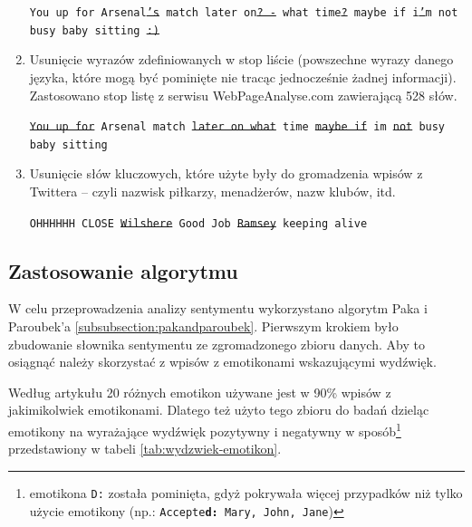 \begin{enumerate}
  \texttt{You up for Arsenal\sout{'s} match later on\sout{? -} what
  time\sout{?} maybe if i\sout{'}m not busy baby sitting \sout{:)}} 
	
	\item Usunięcie wyrazów zdefiniowanych w stop liście (powszechne wyrazy danego
	języka, które mogą być pominięte nie tracąc jednocześnie żadnej informacji).
	Zastosowano stop listę z serwisu \mbox{WebPageAnalyse.com} 
	\cite{WebPageAnalyse} zawierającą 528 słów.

	\texttt{\sout{You up for} Arsenal match \sout{later on what} time \sout{maybe if} 
 	im \sout{not} busy baby sitting}
	
	\item Usunięcie słów kluczowych, które użyte były do gromadzenia wpisów z
	Twittera -- czyli nazwisk piłkarzy, menadżerów, nazw klubów, itd.
	
	
	\texttt{OHHHHHH CLOSE \sout{Wilshere} Good Job \sout{Ramsey} keeping alive}
	
\end{enumerate}





\subsection{Zastosowanie algorytmu}
\label{subsection:sentyment-algorytm}

W celu przeprowadzenia analizy sentymentu wykorzystano algorytm Paka i
Paroubek'a \ref{subsubsection:pakandparoubek}. Pierwszym krokiem było zbudowanie
słownika sentymentu ze zgromadzonego zbioru danych. Aby to osiągnąć należy
skorzystać z wpisów z emotikonami wskazującymi wydźwięk. 

Według artykułu \cite{EmoticonAnalysisTwitter} 20 różnych emotikon używane
jest w 90\% wpisów z jakimikolwiek emotikonami.
Dlatego też użyto tego zbioru do badań dzieląc emotikony na
wyrażające wydźwięk pozytywny i negatywny w sposób\footnote{emotikona \texttt{D:} została pominięta, gdyż
pokrywała więcej przypadków niż tylko użycie emotikony (np.:
\texttt{Accepte\textbf{d:} Mary, John, Jane})} przedstawiony w tabeli
\ref{tab:wydzwiek-emotikon}.

